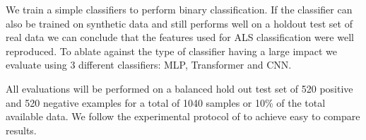 We train a simple classifiers to perform binary classification. If the classifier can also be trained on synthetic data and still performs well on a holdout test set of real data we can conclude that the features used for ALS classification were well reproduced.
To ablate against the type of classifier having a large impact we evaluate using 3 different classifiers: MLP, Transformer and CNN.

All evaluations will be performed on a balanced hold out test set of 520 positive and 520 negative examples for a total of 1040 samples or 10\% of the total available data. We follow the experimental protocol of \citet{capsulenet} to achieve easy to compare results.